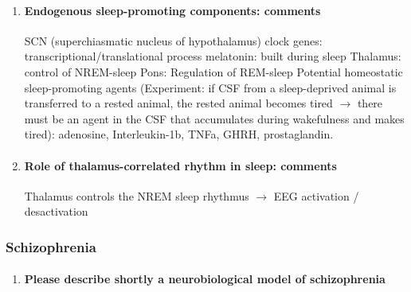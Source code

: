 \documentclass[12pt,article,oneside,a4paper]{memoir}
\begin{document}
\begin{enumerate}
\item \paragraph{Endogenous sleep-promoting components: comments}

SCN (superchiasmatic nucleus of hypothalamus)
	clock genes: transcriptional/translational process
	melatonin: built during sleep
	Thalamus: control of NREM-sleep
	Pons: Regulation of REM-sleep
	Potential homeostatic sleep-promoting agents (Experiment: if CSF from a sleep-deprived animal is transferred to a rested animal, the rested animal becomes tired $\rightarrow$ there must be an agent in the CSF that accumulates during wakefulness and makes tired): adenosine, Interleukin-1b, TNFa, GHRH, prostaglandin.

\item \paragraph{Role of thalamus-correlated rhythm in sleep: comments}

Thalamus controls the NREM sleep rhythmus $\rightarrow$ EEG activation / desactivation
\end{enumerate}

\subsubsection{Schizophrenia}
\begin{enumerate}
\item \paragraph{Please describe shortly a neurobiological model of schizophrenia}
\end{enumerate}
\end{document}
